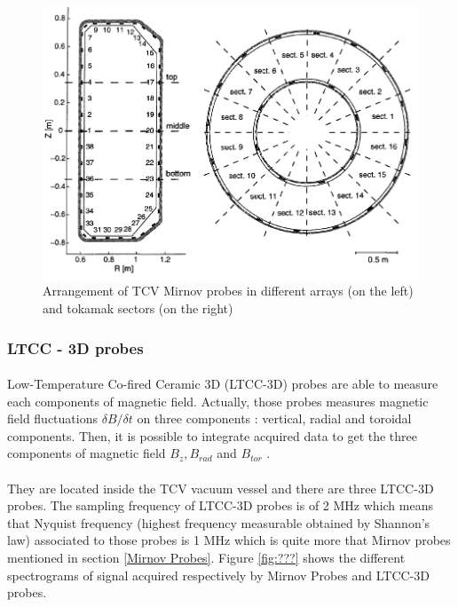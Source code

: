 \documentclass[12pt]{article}
\begin{document}
\begin{figure}
    \centering
    \includegraphics[scale=0.5]{Figures/Mirnov Probes arrangements.png}
    \caption{Arrangement of TCV Mirnov probes in different arrays (on the left) and tokamak sectors (on the right)\cite{holger_reimerdes_mhd_2001}}
    \label{fig:Mirnov Probes}
\end{figure}

\subsubsection{LTCC - 3D probes}

\paragraph{}
Low-Temperature Co-fired Ceramic 3D (LTCC-3D) probes are able to measure each components of magnetic field. Actually, those probes measures magnetic field fluctuations \(\delta B / \delta t\) on three components : vertical, radial and toroidal components. Then, it is possible to integrate acquired data to get the three components of magnetic field \( B_z, B_{rad} \) and \( B_{tor}\) \cite{duccio_testa_manufacturing_2020}. 

\paragraph{}
They are located inside the TCV vacuum vessel and there are three LTCC-3D probes. The sampling frequency of LTCC-3D probes is of 2 MHz which means that Nyquist frequency (highest frequency measurable obtained by Shannon's law) associated to those probes is 1 MHz which is quite more that Mirnov probes mentioned in section \ref{Mirnov Probes}. Figure \ref{fig:???} shows the different spectrograms of signal acquired respectively by Mirnov Probes and LTCC-3D probes. 
\end{document}
